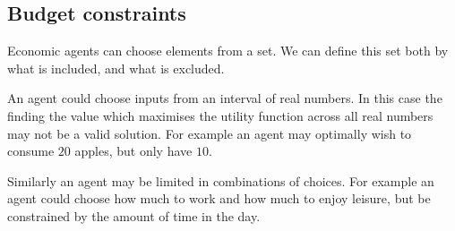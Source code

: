 
\subsection{Budget constraints}

Economic agents can choose elements from a set. We can define this set both by what is included, and what is excluded.

An agent could choose inputs from an interval of real numbers. In this case the finding the value which maximises the utility function across all real numbers may not be a valid solution. For example an agent may optimally wish to consume \(20\) apples, but only have \(10\).

Similarly an agent may be limited in combinations of choices. For example an agent could choose how much to work and how much to enjoy leisure, but be constrained by the amount of time in the day.

